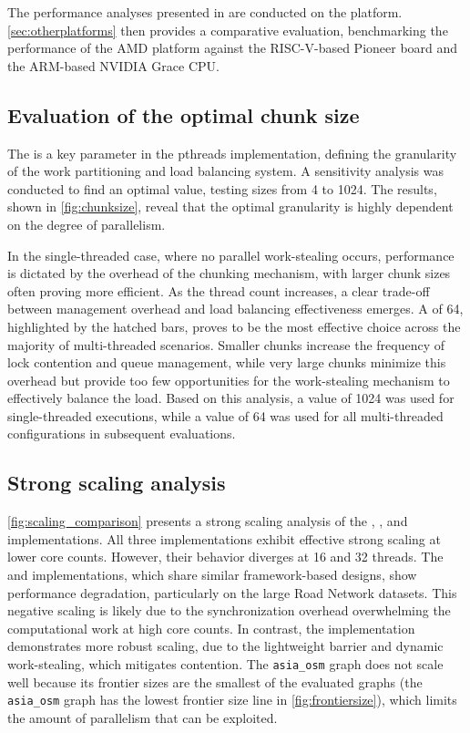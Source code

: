 The performance analyses presented in  are conducted on the \amd{} platform. \cref{sec:otherplatforms} then provides a comparative evaluation, benchmarking the performance of the AMD platform against the RISC-V-based Pioneer board and the ARM-based NVIDIA Grace CPU.

\subsection{Evaluation of the optimal chunk size}
\label{sec:chunksize}
The \chunksize{} is a key parameter in the pthreads implementation, defining the granularity of the work partitioning and load balancing system. A sensitivity analysis was conducted to find an optimal value, testing sizes from 4 to 1024. The results, shown in \cref{fig:chunksize}, reveal that the optimal granularity is highly dependent on the degree of parallelism.

In the single-threaded case, where no parallel work-stealing occurs, performance is dictated by the overhead of the chunking mechanism, with larger chunk sizes often proving more efficient. As the thread count increases, a clear trade-off between management overhead and load balancing effectiveness emerges. A \chunksize{} of 64, highlighted by the hatched bars, proves to be the most effective choice across the majority of multi-threaded scenarios. Smaller chunks increase the frequency of lock contention and queue management, while very large chunks minimize this overhead but provide too few opportunities for the work-stealing mechanism to effectively balance the load. Based on this analysis, a value of 1024 was used for single-threaded executions, while a value of 64 was used for all multi-threaded configurations in subsequent evaluations.

\subsection{Strong scaling analysis}
\label{sec:strongscaling}

\cref{fig:scaling_comparison} presents a strong scaling analysis of the \gapbs{}, \openmp{}, and \pthreads{} implementations. All three implementations exhibit effective strong scaling at lower core counts. However, their behavior diverges at 16 and 32 threads. The \gapbs{} and \openmp{} implementations, which share similar framework-based designs, show performance degradation, particularly on the large Road Network datasets. This negative scaling is likely due to the synchronization overhead overwhelming the computational work at high core counts. In contrast, the \pthreads{} implementation demonstrates more robust scaling, due to the lightweight barrier and dynamic work-stealing, which mitigates contention. The \texttt{asia\_osm} graph does not scale well because its frontier sizes are the smallest of the evaluated graphs (the \texttt{asia\_osm} graph has the lowest frontier size line in \cref{fig:frontiersize}), which limits the amount of parallelism that can be exploited.

